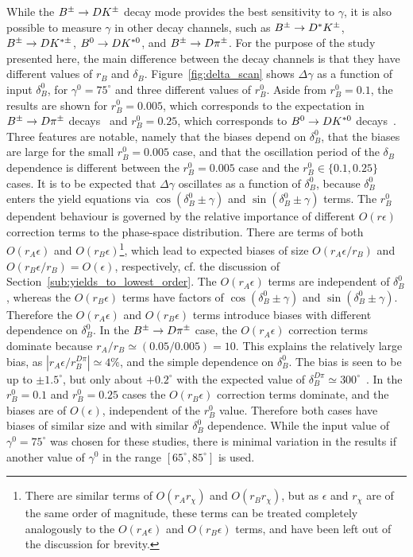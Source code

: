 While the ${{B}^\pm}\rightarrow{\ensuremath{D}}{\ensuremath{{K}^\pm}}$ decay mode provides the best sensitivity to $\gamma$, it is also possible to measure $\gamma$ in other \B decay channels, such as ${{B}^\pm}\rightarrow{\ensuremath{{D}^*}}{\ensuremath{{K}^\pm}}$, ${{B}^\pm}\rightarrow{\ensuremath{D}}{\ensuremath{{K}^{*\pm}}}$, ${{B}^0}\rightarrow{\ensuremath{D}}{\ensuremath{{K}^{*0}}}$, and ${{B}^\pm}\rightarrow{\ensuremath{D}}{\ensuremath{{\pi}^\pm}}$. For the purpose of the study presented here, the main difference between the decay channels is that they have different values of $r_B$ and $\delta_B$. Figure~\ref{fig:delta_scan} shows $\Delta\gamma$ as a function of input $\delta_B^0$, for $\gamma^0=75^\circ$ and three different values of $r_B^0$. Aside from $r_B^0=0.1$, the results are shown for $r_B^0=0.005$, which corresponds to the expectation in ${{B}^\pm}\rightarrow{\ensuremath{D}}{\ensuremath{{\pi}^\pm}}$ decays~\cite{rDpiPaper} and $r_B^0=0.25$, which corresponds to ${{B}^0}\rightarrow{\ensuremath{D}}{\ensuremath{{K}^{*0}}}$ decays~\cite{Gammacombo2016,Gammacombo2018}. Three features are notable, namely that the biases depend on $\delta_B^0$, that the biases are large for the small $r_B^0=0.005$ case, and that the oscillation period of the $\delta_B$ dependence is different between the $r^0_B=0.005$ case and the $r_B^0\in\{0.1, 0.25\}$ cases. It is to be expected that $\Delta\gamma$ oscillates as a function of $\delta^0_B$, because $\delta_B^0$ enters the yield equations via $\cos(\delta_B^0\pm\gamma)$ and $\sin(\delta_B^0\pm\gamma)$ terms. The $r^0_B$ dependent behaviour is governed by the relative importance of different $O(r\epsilon)$ correction terms to the phase-space distribution. There are terms of both $O(r_A\epsilon)$ and $O(r_B\epsilon)$\footnote{There are similar terms of $O(r_Ar_\chi)$ and $O(r_Br_\chi)$, but as $\epsilon$ and $r_\chi$ are of the same order of magnitude, these terms can be treated completely analogously to the $O(r_A\epsilon)$ and $O(r_B\epsilon)$ terms, and have been left out of the discussion for brevity.}, which lead to expected biases of size $O(r_A\epsilon/r_B)$ and $O(r_B\epsilon/r_B)=O(\epsilon)$, respectively, cf. the discussion of Section~\ref{sub:yields_to_lowest_order}. The $O(r_A\epsilon)$ terms are independent of $\delta_B^0$, whereas the $O(r_B\epsilon)$ terms have factors of $\cos(\delta_B^0\pm\gamma)$ and $\sin(\delta_B^0\pm\gamma)$. Therefore the $O(r_A\epsilon)$ and $O(r_B\epsilon)$ terms introduce biases with different dependence on $\delta^0_B$.
In the ${{B}^\pm}\rightarrow{\ensuremath{D}}{\ensuremath{{\pi}^\pm}}$ case, the $O(r_A\epsilon)$ correction terms dominate because $r_A/r_B\simeq (0.05/0.005)=10$. This explains the relatively large bias, as $|r_A\epsilon/r_B^{D\pi}|\simeq 4\%$, and the simple dependence on $\delta^0_B$. The bias is seen to be up to {}$\pm1.5^\circ$, but only about $+0.2^\circ$ with the expected value of $\delta_B^{D\pi}\simeq300^\circ$~\cite{Gammacombo2016,rDpiPaper}. In the $r_B^0=0.1$ and $r_B^0=0.25$ cases the $O(r_B\epsilon)$ correction terms dominate, and the biases are of $O(\epsilon)$, independent of the $r_B^0$ value. Therefore both cases have biases of similar size and with similar $\delta^0_B$ dependence. While the input value of $\gamma^0=75^\circ$ was chosen for these studies, there is minimal variation in the results if another value of $\gamma^0$ in the range $[65^\circ, 85^\circ]$ is used.

